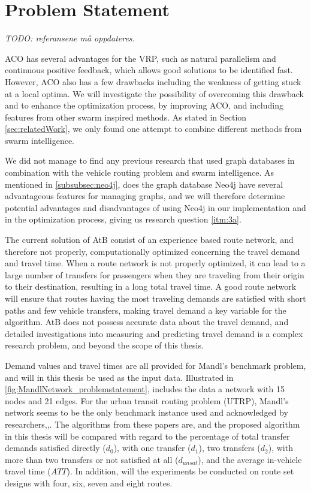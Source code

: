 \section{Problem Statement}
\label{sec:problemStatement}

\emph{\color{blue} TODO: referansene må oppdateres.}

ACO has several advantages for the VRP, such as natural parallelism and continuous positive feedback, which allows good solutions to be identified fast. However, ACO also has a few drawbacks including the weakness of getting stuck at a local optima. We will investigate the possibility of overcoming this drawback and to enhance the optimization process, by improving ACO, and including features from other swarm inspired methods. As stated in Section \vref{sec:relatedWork}, we only found one attempt to combine different methods from swarm intelligence.%

We did not manage to find any previous research that used graph databases in combination with the vehicle routing problem and swarm intelligence. As mentioned in \vref{subsubsec:neo4j}, does the graph database Neo4j \citep{website:neo4j} have several advantageous features for managing graphs, and we will therefore determine potential advantages and disadvantages of using Neo4j in our implementation and in the optimization process, giving us research question \vref{itm:3a}.

The current solution of AtB consist of an experience based route network, and therefore not properly, computationally optimized concerning the travel demand and travel time. When a route network is not properly optimized, it can lead to a large number of transfers for passengers when they are traveling from their origin to their destination, resulting in a long total travel time. A good route network will ensure that routes having the most traveling demands are satisfied with short paths and few vehicle transfers, making travel demand a key variable for the algorithm. AtB\citep{website:atb} does not possess accurate data about the travel demand, and detailed investigations into measuring and predicting travel demand is a complex research problem, and beyond the scope of this thesis. 

Demand values and travel times are all provided for Mandl's benchmark problem\citep{mandl79}, and will in this thesis be used as the input data. Illustrated in \vref{fig:MandlNetwork_problemstatement}, includes the data a network with 15 nodes and 21 edges. For the urban transit routing problem (UTRP), Mandl's network seems to be the only benchmark instance used and acknowledged by researchers\citep{fan09},\citep{kechagiopoulos14},\citep{nikolic14}. The algorithms from these papers are, and the proposed algorithm in this thesis will be compared with regard to the percentage of total transfer demands satisfied directly ($d_0$), with one transfer ($d_1$), two transfers ($d_2$), with more than two transfers or not satisfied at all ($d_{unsat}$), and the average in-vehicle travel time ($ATT$). In addition, will the experiments be conducted on route set designs with four, six, seven and eight routes. 

